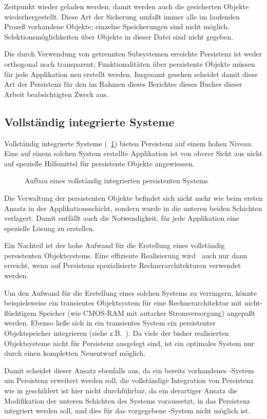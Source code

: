 Zeitpunkt wieder geladen werden; damit werden auch die gesicherten
Objekte wiederhergestellt. Diese Art der Sicherung umfa\ss{}t immer alle
im laufenden Proze\ss{} vorhandene Objekte; einzelne Speicherungen sind
nicht m\"{o}glich. Selektionsm\"{o}glichkeiten \"{u}ber Objekte in dieser Datei
sind nicht gegeben.
%
\par{}Die durch Verwendung von getrennten Subsystemen erreichte
Persistenz ist weder orthogonal noch transparent; Funktionalit\"{a}ten
\"{u}ber persistente Objekte m\"{u}ssen f\"{u}r jede Applikation neu
erstellt werden. Insgesamt gesehen scheidet damit diese Art der
Persistenz f\"{u}r den im Rahmen \ifbericht dieses Berichtes
\else\ifbuch dieses Buches \else dieser Arbeit \fi\fi beabsichtigten
Zweck aus.
%
\subsection{Vollst\"{a}ndig integrierte Systeme}%
\label{sec:arcis}%
%
Vollst\"{a}ndig integrierte Systeme (\figurename~\ref{fig:operlay}) bieten
Persistenz auf einem hohen Niveau. Eine auf einem solchen System
erstellte Applikation ist von oberer Sicht aus nicht auf spezielle
Hilfsmittel f\"{u}r persistente Objekte angewiessen.
%
\begin{figure}[hbtp]%
\ifbuch%
\centerline{}%
\else%
\centerline{}%
\fi%
\caption{Aufbau eines vollst\"{a}ndig integrierten persistenten
Systems}\label{fig:operlay}%
\end{figure}%
%
Die Verwaltung der persistenten Objekte befindet sich nicht mehr wie
beim ersten Ansatz in der Applikationsschicht, sondern wurde in die
unteren beiden Schichten verlagert. Damit entf\"{a}llt auch die
Notwendigkeit, f\"{u}r jede Applikation eine spezielle L\"{o}sung zu
erstellen.
%
\par{}Ein Nachteil ist der hohe Aufwand f\"{u}r die Erstellung eines
vollst\"{a}ndig persistenten Objektsystems. Eine effiziente Realisierung
wird \ia\ auch nur dann erreicht, wenn auf Persistenz
spezialisierte Rechnerarchitekturen verwendet werden.
%
\par{}Um den Aufwand f\"{u}r die Erstellung eines solchen Systems zu
verringern, k\"{o}nnte beispielsweise ein transientes Objektsystem
f\"{u}r eine Rechnerarchitektur mit nicht-fl\"{u}chtigem Speicher (wie
CMOS-RAM mit autarker Stromversorgung) angepa\ss{}t werden. Ebenso lie\ss{}e
sich in ein transientes System ein persistenter Objektspeicher
integrieren (siehe z.B.\ \cite[]{bib:mu91}). Da
viele der bisher realisierten Objektsysteme nicht f\"{u}r Persistenz
ausgelegt sind, ist ein optimales System nur durch einen kompletten
Neuentwurf m\"{o}glich.
%
\par{}Damit scheidet dieser Ansatz ebenfalls aus, da ein bereits
vorhandenes \clos-System um Persistenz erweitert werden soll; die
vollst\"{a}ndige Integration von Persistenz wie in
\cite[]{bib:mu91} geschildert ist hier nicht
durchf\"{u}hrbar, da ein derartiger Ansatz die Modifikation der unteren
Schichten des Systems voraussetzt, in das Persistenz integriert werden
soll, und dies f\"{u}r das vorgegebene \clos-System nicht m\"{o}glich ist.
%

